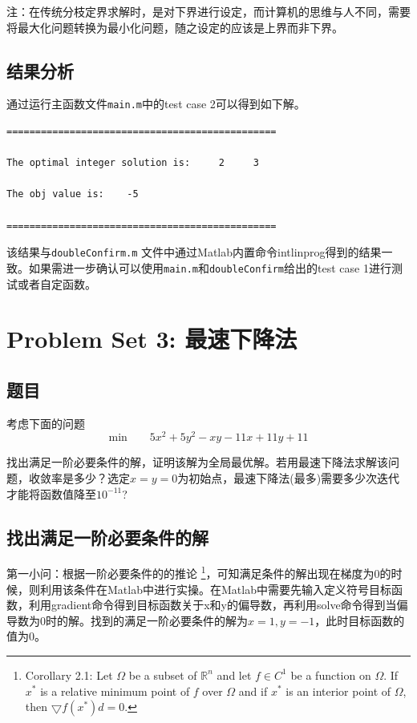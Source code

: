 \documentclass[a4paper, 12pt]{ctexart}  %
\begin{document}
注：在传统分枝定界求解时，是对下界进行设定，而计算机的思维与人不同，需要将最大化问题转换为最小化问题，随之设定的应该是上界而非下界。

\subsection{结果分析}
通过运行主函数文件\verb|main.m|中的test case 2可以得到如下解。
\begin{verbatim}
===============================================

The optimal integer solution is:     2     3

The obj value is:    -5

===============================================
\end{verbatim}

该结果与\verb|doubleConfirm.m| 文件中通过Matlab内置命令intlinprog得到的结果一致。如果需进一步确认可以使用\verb|main.m|和\verb|doubleConfirm|给出的test case 1进行测试或者自定函数。


\section{Problem Set 3: 最速下降法}
\subsection{题目}
考虑下面的问题
\begin{equation}
\text{min} \qquad 5x^2+5y^2-xy-11x+11y+11
\end{equation}

找出满足一阶必要条件的解，证明该解为全局最优解。若用最速下降法求解该问题，收敛率是多少？选定$x=y=0$为初始点，最速下降法(最多)需要多少次迭代才能将函数值降至$10^{-11}$?

\subsection{找出满足一阶必要条件的解}
第一小问：根据一阶必要条件的的推论 \footnote{Corollary 2.1: Let $\Omega$ be a subset of $\mathbb{R}^n$  and let $f\in C^1$ be a function on $\Omega$. If $x^\ast$ is a relative minimum point of $f$ over $\Omega$ and if $x^\ast$ is an interior point of  $\Omega$, then $\bigtriangledown f(x^\ast)d = 0$.}，可知满足条件的解出现在梯度为0的时候，则利用该条件在Matlab中进行实操。在Matlab中需要先输入定义符号目标函数，利用gradient命令得到目标函数关于x和y的偏导数，再利用solve命令得到当偏导数为0时的解。找到的满足一阶必要条件的解为$x=1, y=-1$，此时目标函数的值为0。
\end{document}
